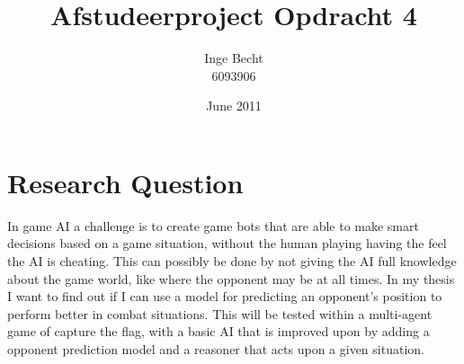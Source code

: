 \documentclass{article}
\title{Afstudeerproject Opdracht 4}
\author{Inge Becht \\ 6093906}
\date{June 2011}
\begin{document}
\maketitle
\section{Research Question}
In game AI a challenge is to create game bots that are able to make smart decisions based on a game situation, without the human playing having the feel the AI is cheating. This can possibly be done by not giving the AI full knowledge about the game world, like where the opponent may be at all times. In my thesis I want to find out if I can use a model for predicting an opponent's position to perform better in combat situations. This will be tested within a multi-agent game of capture the flag, with a basic AI that is improved upon by adding a opponent prediction model and a reasoner that acts upon a given situation.
\end{document}
